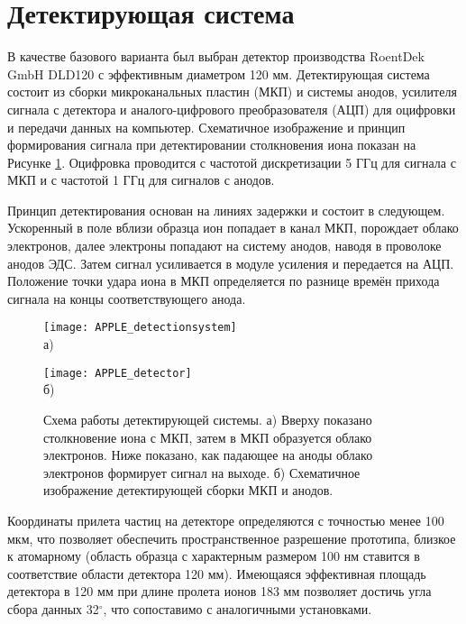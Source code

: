 \FloatBarrier

\section{Детектирующая система}\label{sec:ch2/sec4}

В качестве базового варианта был выбран детектор производства RoentDek GmbH DLD120 с эффективным диаметром 120 мм. Детектирующая система состоит из сборки микроканальных пластин (МКП) и системы анодов, усилителя сигнала с детектора и аналого-цифрового преобразователя (АЦП) для оцифровки и передачи данных на компьютер. Схематичное изображение и принцип формирования сигнала при детектировании столкновения иона показан на Рисунке \cref{fig:APPLE_detectionsystem}. Оцифровка проводится с частотой дискретизации 5 ГГц для сигнала с МКП и с частотой 1 ГГц для сигналов с анодов. 

Принцип детектирования \cite{Spillman00} основан на линиях задержки и состоит в следующем. Ускоренный в поле вблизи образца ион попадает в канал МКП, порождает облако электронов, далее электроны попадают на систему анодов, наводя в проволоке анодов ЭДС. Затем сигнал усиливается в модуле усиления и передается на АЦП. Положение точки удара иона в МКП определяется по разнице времён прихода сигнала на концы соответствующего анода. 

\begin{figure}[ht]
	\begin{minipage}[b]{0.49\textwidth}\centering
		\texttt{[image: APPLE\_detectionsystem]} \\ а)
	\end{minipage}
	\begin{minipage}[b]{0.49\textwidth}\centering
		\texttt{[image: APPLE\_detector]} \\ б)
	\end{minipage}
	\caption{Схема работы детектирующей системы. а) Вверху показано столкновение иона с МКП, затем в МКП образуется облако электронов. Ниже показано, как падающее на аноды облако электронов формирует сигнал на выходе. б) Схематичное изображение детектирующей сборки МКП и анодов.}
	\label{fig:APPLE_detectionsystem}
\end{figure}


Координаты прилета частиц на детекторе определяются с точностью менее 100 мкм, что позволяет обеспечить пространственное разрешение прототипа, близкое к атомарному (область образца с характерным размером 100 нм ставится в соответствие области детектора 120 мм). Имеющаяся эффективная площадь детектора в 120 мм при длине пролета ионов 183 мм позволяет достичь угла сбора данных 32$^{\circ}$, что сопоставимо с аналогичными установками.

